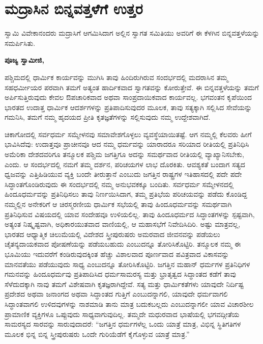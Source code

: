 
\chapter{ಮದ್ರಾಸಿನ ಬಿನ್ನವತ್ತಳೆಗೆ ಉತ್ತರ}

ಸ್ವಾಮಿ ವಿವೇಕಾನಂದರು ಮದ್ರಾಸಿಗೆ ಆಗಮಿಸಿದಾಗ ಅಲ್ಲಿನ ಸ್ವಾಗತ ಸಮಿತಿಯು ಅವರಿಗೆ ಈ ಕೆಳಗಿನ ಬಿನ್ನವತ್ತಳೆಯನ್ನು ಸಮರ್ಪಿಸಿತು.

\vskip 0.2cm

\textbf{ಪೂಜ್ಯ ಸ್ವಾಮೀಜಿ,}

\vskip 0.2cm

ಪಶ್ಚಿಮದಲ್ಲಿ ಧಾರ್ಮಿಕ ಕಾರ್ಯವನ್ನು ಮುಗಿಸಿ ತಾವು ಹಿಂದಿರುಗಿರುವ ಸಂದರ್ಭದಲ್ಲಿ ಮದರಾಸಿನ ತಮ್ಮ ಸಹಧರ್ಮೀಯರ ಪರವಾಗಿ ತಮಗೆ ಅತ್ಯಂತ ಹಾರ್ದಿಕವಾದ ಸ್ವಾಗತವನ್ನು ಕೋರುತ್ತೇವೆ. ಈ ಬಿನ್ನವತ್ತಳೆಯನ್ನು ತಮಗೆ ಅರ್ಪಿಸುತ್ತಿರುವುದು ಕೇವಲ ಔಪಚಾರಿಕವಾದ ಅಥವಾ ಸಾಂಪ್ರದಾಯಿಕವಾದ ಕಾರ್ಯವಲ್ಲ. ಭಗವಂತನ ಕೃಪೆಯಿಂದ ಭಾರತದ ಉದಾತ್ತ ಧಾರ್ಮಿಕ ಆದರ್ಶಗಳನ್ನು ಪ್ರತಿಪಾದಿಸುವುದರ ಮೂಲಕ, ತಾವು ಸತ್ಯಕ್ಕಾಗಿ ಸಲ್ಲಿಸಿದ ಸೇವೆಯನ್ನು ಗಮನಿಸಿ, ತಮಗೆ ನಮ್ಮ ಹೃದಯದ ಪ್ರೀತಿ ಕೃತಜ್ಞತೆಗಳನ್ನು ಸಲ್ಲಿಸುವುದು ನಮ್ಮ ಉದ್ದೇಶವಾಗಿದೆ.

\vskip 0.2cm

ಚಿಕಾಗೋದಲ್ಲಿ ಸರ್ವಧರ್ಮ ಸಮ್ಮೇಳನವು ಸಮಾವೇಶಗೊಳ್ಳಲು ವ್ಯವಸ್ಥೆಯಾಯಿತಷ್ಟೆ. ಆಗ ನಮ್ಮಲ್ಲಿ ಕೆಲವರು ಹೀಗೆ ಭಾವಿಸಿದೆವು: ಉದಾತ್ತವೂ ಪ್ರಾಚೀನವೂ ಆದ ನಮ್ಮ ಧರ್ಮವನ್ನು ಯಾರಾದರೂ ಸರಿಯಾದ ರೀತಿಯಲ್ಲಿ ಪ್ರತಿನಿಧಿಸಿ ಅಮೆರಿಕಾ ದೇಶದವರಿಗೂ ತನ್ಮೂಲಕ ಪಶ್ಚಿಮ ಜಗತ್ತಿಗೂ ಅದನ್ನು ಸಮರ್ಥವಾದ ರೀತಿಯಲ್ಲಿ ವ್ಯಾಖ್ಯಾನಿಸಬೇಕು, ಎಂದು. ಆ ಸಂದರ್ಭದಲ್ಲಿ ನಮಗೆ ತಮ್ಮ ದರ್ಶನ, ಪರಿಚಯಗಳ ಲಾಭ ದೊರಕಿತು. ಆವಶ್ಯಕತೆ ಬಂದಾಗ ಸತ್ಯದ ಧ್ವಜವನ್ನು ಎತ್ತಿಹಿಡಿಯುವ ವ್ಯಕ್ತಿ ಬಂದೇ ತೀರುತ್ತಾನೆ ಎಂಬುದು ಜಗತ್ತಿನ ರಾಷ್ಟ್ರಗಳ ಇತಿಹಾಸದಲ್ಲಿ ಪದೇ ಪದೇ ಸಿದ್ಧಾಂತಗೊಂಡಿರುವುದು ಈ ಸಂದರ್ಭದಲ್ಲಿ ನಮ್ಮ ಅನುಭವಕಕ್ಕೂ ಬಂದಿತು. ಸರ್ವಧರ್ಮ ಸಮ್ಮೇಳನದಲ್ಲಿ ಹಿಂದೂಧರ್ಮವನ್ನು ಪ್ರತಿನಿಧಿಸಲು ತಾವು ನಿರ್ಣಯಿಸಿದಾಗ, ತಮ್ಮ ಪ್ರತಿಭೆಯ ಪರಿಚಯವನ್ನು ಪಡೆದು ಕೊಂಡಿದ್ದ ನಮ್ಮಲ್ಲಿನ ಅನೇಕರಿಗೆ ಆ ಚಿರಸ್ಮರಣೀಯ ಧಾರ್ಮಿಕ ಸಭೆಯಲ್ಲಿ ತಾವು ಹಿಂದೂಧರ್ಮವನ್ನು ಸಮರ್ಥವಾಗಿ ಪ್ರತಿನಿಧಿಸುವ ವಿಷಯದಲ್ಲಿ ಯಾವ ಸಂದೇಹವೂ ಉಳಿಯ\-ಲಿಲ್ಲ. ತಾವು ಹಿಂದೂಧರ್ಮದ ಸಿದ್ಧಾಂತಗಳನ್ನು ಸ್ಪಷ್ಟವಾಗಿ, ಅತ್ಯಂತ ನಿಷ್ಕೃಷ್ಟವಾಗಿ, ಅಧಿಕಾರಯುತವಾದ ವಾಣಿಯಲ್ಲಿ, ಆ ಮಹಾಸಭೆಗೆ ನಿವೇದಿಸಿದಿರಿ. ಅಷ್ಟು ಮಾತ್ರವಲ್ಲ, ಭಾರತದ ಆಧ್ಯಾತ್ಮಿಕ ಚಿಲುಮೆಯಲ್ಲಿ ವಿದೇಶದ ಸ್ತ್ರೀಪುರುಷರು ಅಮರವಾದ ಜೀವನವನ್ನು ಪಡೆಯಲು ಚೈತನ್ಯದಾಯಕವಾದ ಪೋಷಣೆಯನ್ನು ಪಡೆಯಬಹುದು ಎಂಬುದನ್ನೂ ತೋರಿಸಿಕೊಟ್ಟಿರಿ. ತನ್ಮೂಲಕ ನಮ್ಮ ಈ ಭೂಮಿಯು ಇದುವರೆಗೆ ಕಂಡಿರುವುದಕ್ಕಿಂತ ಹೆಚ್ಚು ವಿಶಾಲವಾದ ಪೂರ್ಣವಾದ ಪವಿತ್ರವಾದ ವಿಕಾಸವನ್ನು ಮಾನವತೆಯು ಪಡೆಯುವುದು ಸಾಧ್ಯ ಎಂಬುದನ್ನೂ ತೋರಿಸಿಕೊಟ್ಟಿರಿ. ಜಗತ್ತಿನ ಮಹಾನ್​ ಧರ್ಮಗಳ ಪ್ರತಿನಿಧಿಗಳ ಗಮನವನ್ನು ಹಿಂದೂಧರ್ಮವು ಪ್ರತಿಪಾದಿಸಿದ ಧರ್ಮಸಾಮರಸ್ಯ ಮತ್ತು ಭ್ರಾತೃತ್ವದ ಸಿದ್ಧಾಂತದ ಕಡೆಗೆ ತಾವು ಸೆಳೆದುದಕ್ಕಾಗಿ ನಾವು ತಮಗೆ ವಿಶೇಷವಾಗಿ ಕೃತಜ್ಞರಾಗಿದ್ದೇವೆ. ಸತ್ಯ ಮತ್ತು ಧಾರ್ಮಿಕತೆಗಳು ಯಾವುದೇ ನಿರ್ದಿಷ್ಟ ಪ್ರದೇಶದ ಅಥವಾ ಜನಾಂಗದ ಅಥವಾ ಸಿದ್ಧಾಂತದ ಗುತ್ತಿಗೆ ಎಂಬುದನ್ನಾಗಲಿ, ಯಾವುದೇ ಧರ್ಮವಾಗಲಿ ಸಿದ್ಧಾಂತವಾಗಲಿ ಉಳಿದವು\-ಗಳನ್ನು ನಾಶಮಾಡಿ ತಾನು ಮಾತ್ರ ಬದುಕಬಲ್ಲದು ಎಂಬುದನ್ನಾಗಲೀ ಯಾವ ವಿಚಾರಶೀಲ ಪ್ರಾಮಾಣಿಕ ವ್ಯಕ್ತಿಗಳೂ ಒಪ್ಪುವುದು ಸಾಧ್ಯವಾಗುವುದಿಲ್ಲ. ತಮ್ಮದೇ ಮಧುರವಾದ ಭಾಷೆಯಲ್ಲಿ ಭಗವದ್ಗೀತೆಯ ಸಾಮರಸ್ಯದ ಸಾರವನ್ನು ಸಾರುವುದಾದರೆ: “ಜಗತ್ತಿನ ಧರ್ಮಗಳೆಲ್ಲ ಒಂದು ಯಾತ್ರೆ ಮಾತ್ರ, ವಿಭಿನ್ನ ಸ್ಥಿತಿಗತಿಗಳ ಮೂಲಕ ಭಿನ್ನ ಬಿನ್ನ ಸ್ತ್ರೀಪುರುಷರು ಒಂದೇ ಗುರಿಯೆಡೆಗೆ ಕೈಗೊಳ್ಳುವ ಯಾತ್ರೆ ಮಾತ್ರ.”

